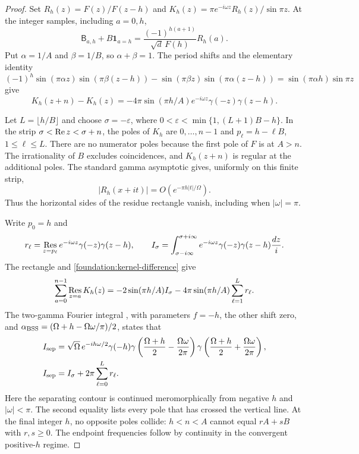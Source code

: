 \documentclass[11pt]{article}
\numberwithin{equation}{section}
\theoremstyle{definition}
\theoremstyle{remark}
\begin{document}
\begin{proof}
Set $R_h(z)=F(z)/F(z-h)$ and
$K_h(z)=\pi e^{-i\omega z}R_h(z)/\sin\pi z$.
At the integer samples, including $a=0,h$,
\begin{equation}\label{foundation:sample}
 \mathsf B_{a,h}+B\mathbf1_{a=h}
 =\frac{(-1)^{h(a+1)}}{\sqrt d\,F(h)}R_h(a).
\end{equation}
Put $\alpha=1/A$ and $\beta=1/B$, so $\alpha+\beta=1$.
The period shifts and the elementary identity
\[
 (-1)^h\sin(\pi\alpha z)\sin(\pi\beta(z-h))
 -\sin(\pi\beta z)\sin(\pi\alpha(z-h))
 =\sin(\pi\alpha h)\sin\pi z
\]
give
\begin{equation}\label{foundation:kernel-difference}
 K_h(z+n)-K_h(z)
 =-4\pi\sin(\pi h/A)e^{-i\omega z}\gamma(-z)\gamma(z-h).
\end{equation}

Let $L=\lfloor h/B\rfloor$ and choose
$\sigma=-\varepsilon$, where
$0<\varepsilon<\min\{1,(L+1)B-h\}$. In the strip
$\sigma<\mathop{\rm Re}z<\sigma+n$, the poles of $K_h$ are
$0,\ldots,n-1$ and $p_\ell=h-\ell B$, $1\leq\ell\leq L$.
There are no numerator poles because the first pole of $F$ is at
$A>n$. The irrationality of $B$ excludes coincidences, and
$K_h(z+n)$ is regular at the additional poles.
The standard gamma asymptotic gives, uniformly on this finite strip,
\[
 |R_h(x+it)|=O(e^{-\pi h|t|/\Omega}).
\]
Thus the horizontal sides of the residue rectangle vanish, including
when $|\omega|=\pi$.

Write $p_0=h$ and
\[
 r_\ell=\mathop{\rm Res}_{z=p_\ell}
         e^{-i\omega z}\gamma(-z)\gamma(z-h),\qquad
 I_\sigma=\int_{\sigma-i\infty}^{\sigma+i\infty}
         e^{-i\omega z}\gamma(-z)\gamma(z-h)\frac{dz}{i}.
\]
The rectangle and \eqref{foundation:kernel-difference} give
\begin{equation}\label{foundation:rectangle}
 \sum_{a=0}^{n-1}\mathop{\rm Res}_{z=a}K_h(z)
 =-2\sin(\pi h/A)I_\sigma
  -4\pi\sin(\pi h/A)\sum_{\ell=1}^{L}r_\ell.
\end{equation}
The two-gamma Fourier integral \cite[Eq.~(2.17)]{BSS}, with
parameters $f=-h$, the other shift zero, and
$\alpha_{\rm BSS}=(\Omega+h-\Omega\omega/\pi)/2$, states that
\begin{align}
 I_{\rm sep}
 &=\sqrt\Omega\,e^{-ih\omega/2}\gamma(-h)
   \gamma\left(\frac{\Omega+h}{2}-\frac{\Omega\omega}{2\pi}\right)
   \gamma\left(\frac{\Omega+h}{2}+\frac{\Omega\omega}{2\pi}\right),
   \label{foundation:beta}\\
 I_{\rm sep}&=I_\sigma+2\pi\sum_{\ell=0}^{L}r_\ell.
   \label{foundation:continued-contour}
\end{align}
Here the separating contour is continued meromorphically from negative
$h$ and $|\omega|<\pi$. The second equality lists every pole that
has crossed the vertical line. At the final integer $h$, no opposite
poles collide: $h<n<A$ cannot equal $rA+sB$ with $r,s\geq0$.
The endpoint frequencies follow by continuity in the convergent
positive-$h$ regime.


\end{proof}
\end{document}
